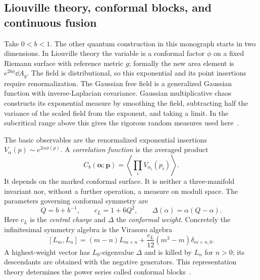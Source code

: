 \subsection{Liouville theory, conformal blocks, and continuous fusion}
\label{sec:introLiouville}

Take $0<b<1$. The other quantum construction in this monograph starts in two
dimensions. In Liouville theory the variable is a conformal factor
$\phi$ on a fixed Riemann surface with reference metric $g$;
formally the new area element is $e^{2b\phi}\dd A_g$.
The field is distributional, so this exponential and its point
insertions require renormalization. The Gaussian free field is a
generalized Gaussian function with inverse-Laplacian covariance.
Gaussian multiplicative chaos constructs its exponential measure
by smoothing the field, subtracting half the variance of the
scaled field from the exponent, and taking a limit. In the subcritical range above this
gives the rigorous random measures used here~\cite{KRV}.

The basic observables are the renormalized exponential insertions
$V_\alpha(p)\sim e^{2\alpha\phi(p)}$. A \emph{correlation function}
is the averaged product
\[
 C_b(\boldsymbol\alpha;\boldsymbol p)
       =\left\langle\prod_i V_{\alpha_i}(p_i)\right\rangle.
\]
It depends on the marked conformal surface. It is neither a
three-manifold invariant nor, without a further operation, a
measure on moduli space. The parameters governing conformal
symmetry are
\begin{equation}
 Q=b+b^{-1},\qquad c_L=1+6Q^2,\qquad
 \Delta(\alpha)=\alpha(Q-\alpha).
 \label{eq:introLiouvilleparameters}
\end{equation}
Here $c_L$ is the \emph{central charge} and $\Delta$ the
\emph{conformal weight}. Concretely the infinitesimal symmetry
algebra is the Virasoro algebra
\[
 [L_m,L_n]=(m-n)L_{m+n}
       +\frac{c_L}{12}(m^3-m)\delta_{m+n,0}.
\]
A highest-weight vector has $L_0$-eigenvalue $\Delta$ and is killed
by $L_n$ for $n>0$; its descendants are obtained with the negative
generators. This representation theory determines the power
series called conformal blocks~\cite{TeschnerRevisited}.


